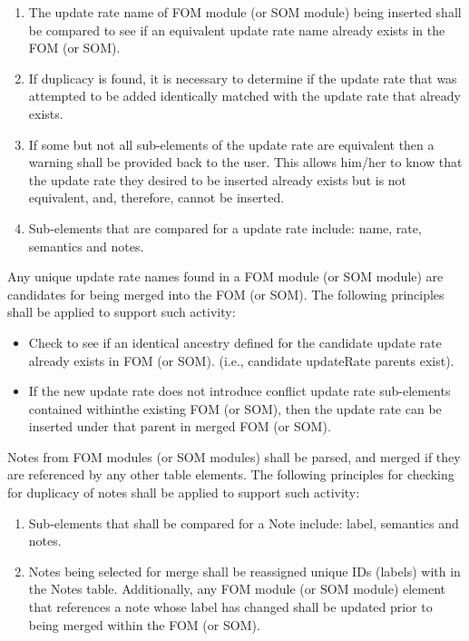 \begin{enumerate}[leftmargin=52pt,labelsep=12pt,label=\arabic*),itemsep=0pt,topsep=-2pt,partopsep=0pt,parsep=0pt]
\item The update rate name of FOM module (or SOM module) being inserted shall be compared to see if an equivalent update rate name already exists in the FOM (or SOM).
\item If duplicacy is found, it is necessary to determine if the update rate that was attempted to be added identically matched with the update rate that already exists.
\item If some but not all sub-elements of the update rate are equivalent then a warning shall be provided back to the user. This allows him/her to know that the update rate they desired to be inserted already exists but is not equivalent, and, therefore, cannot be inserted.
\item Sub-elements that are compared for a update rate include: name, rate, semantics and notes.
\end{enumerate}

Any unique update rate names found in a FOM module (or SOM module) are candidates for being merged into the FOM (or SOM). The following principles shall be applied to support such activity:

\begin{itemize}[leftmargin=54pt,labelsep=12pt,itemsep=0pt,topsep=-2pt,partopsep=0pt,parsep=0pt]
\item Check to see if an identical ancestry defined for the candidate update rate already exists in FOM (or SOM). (i.e., candidate updateRate parents exist).
\item If the new update rate does not introduce conflict update rate sub-elements contained within\linebreak the existing FOM (or SOM), then the update rate can be inserted under that parent in merged FOM (or SOM).
\end{itemize}

\vspace{10.25pt}
Notes from FOM modules (or SOM modules) shall be parsed, and merged if they are referenced by any other table elements. The following principles for checking for duplicacy of notes shall be applied to support such activity:

\begin{enumerate}[leftmargin=52pt,labelsep=12pt,label=\arabic*),itemsep=3pt,topsep=0.2pt,partopsep=0pt,parsep=0pt]
\item Sub-elements that shall be compared for a Note include: label, semantics and notes.
\item Notes being selected for merge shall be reassigned unique IDs (labels) with in the Notes table. Additionally, any FOM module (or SOM module) element that references a note whose label has changed shall be updated prior to being merged within the FOM (or SOM).
\end{enumerate}
\endgroup

